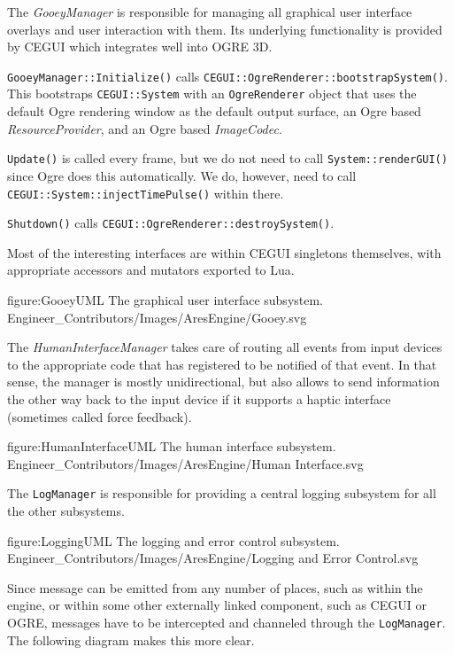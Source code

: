 \page 
{}
The {\it GooeyManager} is responsible for managing all graphical user interface overlays and user interaction with them. Its underlying functionality is provided by CEGUI which integrates well into OGRE 3D.

{\tt GooeyManager::Initialize()} calls {\tt CEGUI::OgreRenderer::bootstrapSystem()}. This bootstraps {\tt CEGUI::System} with an {\tt OgreRenderer} object that uses the default Ogre rendering window as the default output surface, an Ogre based {\it ResourceProvider}, and an Ogre based {\it ImageCodec}.

{\tt Update()} is called every frame, but we do not need to call {\tt System::renderGUI()} since Ogre does this automatically. We do, however, need to call {\tt CEGUI::System::injectTimePulse()} within there.

{\tt Shutdown()} calls {\tt CEGUI::OgreRenderer::destroySystem()}.

Most of the interesting interfaces are within CEGUI singletons themselves, with appropriate accessors and mutators exported to Lua.

\FullPageDiagram
    {figure:GooeyUML}
    {The graphical user interface subsystem.}
    {Engineer_Contributors/Images/AresEngine/Gooey.svg}

\page 
{}
The {\it HumanInterfaceManager} takes care of routing all events from input devices to the appropriate code that has registered to be notified of that event. In that sense, the manager is mostly unidirectional, but also allows to send information the other way back to the input device if it supports a haptic interface (sometimes called force feedback).

\FullPageDiagram
    {figure:HumanInterfaceUML}
    {The human interface subsystem.}
    {Engineer_Contributors/Images/AresEngine/Human Interface.svg}

\page 
{}
The {\tt LogManager} is responsible for providing a central logging subsystem for all the other subsystems.

\FullPageDiagram
    {figure:LoggingUML}
    {The logging and error control subsystem.}
    {Engineer_Contributors/Images/AresEngine/Logging and Error Control.svg}
    
Since message can be emitted from any number of places, such as within the engine, or within some other externally linked component, such as CEGUI or OGRE, messages have to be intercepted and channeled through the {\tt LogManager}. The following diagram makes this more clear.

